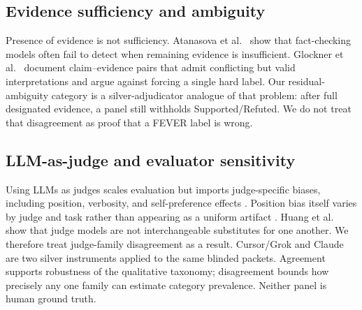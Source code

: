 \subsection{Evidence sufficiency and ambiguity}
Presence of evidence is not sufficiency.
Atanasova et al.\ \citep{atanasova-etal-2022-fact} show that fact-checking models often fail to detect when remaining evidence is insufficient.
Glockner et al.\ \citep{glockner-etal-2024-ambifc} document claim--evidence pairs that admit conflicting but valid interpretations and argue against forcing a single hard label.
Our residual-ambiguity category is a silver-adjudicator analogue of that problem: after full designated evidence, a panel still withholds Supported/Refuted.
We do not treat that disagreement as proof that a FEVER label is wrong.

\subsection{LLM-as-judge and evaluator sensitivity}
Using LLMs as judges scales evaluation but imports judge-specific biases, including position, verbosity, and self-preference effects \citep{zheng2023judging,liu-etal-2023-g,chen-etal-2024-humans}.
Position bias itself varies by judge and task rather than appearing as a uniform artifact \citep{shi-etal-2025-judging}.
Huang et al.\ \citep{huang-etal-2025-empirical} show that judge models are not interchangeable substitutes for one another.
We therefore treat judge-family disagreement as a result.
Cursor/Grok and Claude are two silver instruments applied to the same blinded packets.
Agreement supports robustness of the qualitative taxonomy; disagreement bounds how precisely any one family can estimate category prevalence.
Neither panel is human ground truth.
